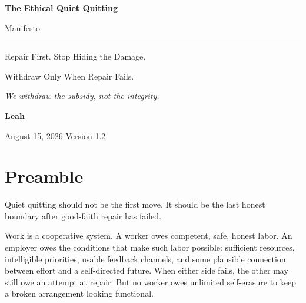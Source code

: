 \documentclass[11pt,oneside]{article}
\begin{document}
\hypersetup{pageanchor=false}

\begin{titlepage}
\thispagestyle{empty}
\vspace*{0.9in}

{\sffamily\bfseries\fontsize{31}{36}\selectfont\color{ManifestInk}
The Ethical Quiet Quitting\par
Manifesto\par}

\vspace{0.5em}
{\color{ManifestRule}\rule{\textwidth}{1.2pt}}
\vspace{1.0em}

{\sffamily\fontsize{17}{23}\selectfont\color{ManifestGray}
Repair First. Stop Hiding the Damage.\par
Withdraw Only When Repair Fails.\par}

\vfill

\begin{tcolorbox}[
  enhanced,
  colback=ManifestLight,
  colframe=ManifestRule,
  boxrule=0pt,
  leftrule=4pt,
  arc=0pt,
  left=14pt,right=14pt,top=13pt,bottom=13pt
]
{\Large\itshape We withdraw the subsidy, not the integrity.}
\end{tcolorbox}

\vfill

{\sffamily\large\bfseries Leah\par}
\vspace{0.2em}
{\sffamily\color{ManifestGray}August 15, 2026 \quad Version 1.2\par}
\vspace{0.55in}
\end{titlepage}

\thispagestyle{plain}
\tableofcontents
\clearpage
{}
\hypersetup{pageanchor=true}

\section{Preamble}\label{preamble}

Quiet quitting should not be the first move. It should be the last
honest boundary after good-faith repair has failed.

Work is a cooperative system. A worker owes competent, safe, honest
labor. An employer owes the conditions that make such labor possible:
sufficient resources, intelligible priorities, usable feedback channels,
and some plausible connection between effort and a self-directed future.
When either side fails, the other may still owe an attempt at repair.
But no worker owes unlimited self-erasure to keep a broken arrangement
looking functional.
\end{document}
